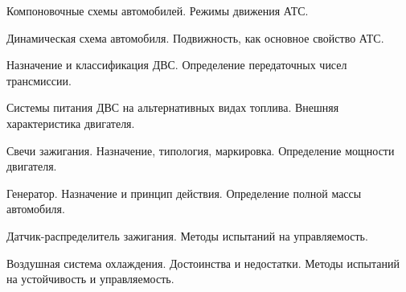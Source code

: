 \documentclass[
	14pt,
	a4paper,
	]
	{scrartcl}
\begin{document}
\newpage


\shapk
{}
\setcounter{zad}{0}

\vfill
\z Компоновочные схемы автомобилей.
 \vfill
\z Режимы движения АТС.
 \vfill

\vfill

\newpage


\shapk
{}
\setcounter{zad}{0}

\vfill
\z Динамическая схема  автомобиля.
 \vfill
\z Подвижность, как основное свойство АТС.
 \vfill

\vfill

\newpage


\shapk
{}
\setcounter{zad}{0}

\vfill
\z Назначение и классификация ДВС.
 \vfill
\z Определение передаточных чисел трансмиссии.
 \vfill

\vfill

\newpage


\shapk
{}
\setcounter{zad}{0}

\vfill
\z Системы питания ДВС на альтернативных видах топлива.
 \vfill
\z Внешняя характеристика двигателя.
 \vfill

\vfill

\newpage


\shapk
{}
\setcounter{zad}{0}

\vfill
\z Свечи зажигания. Назначение, типология, маркировка.
 \vfill
\z Определение мощности двигателя.
 \vfill

\vfill

\newpage


\shapk
{}
\setcounter{zad}{0}

\vfill
\z Генератор. Назначение и принцип действия.
 \vfill
\z Определение полной массы автомобиля.
 \vfill

\vfill

\newpage


\shapk
{}
\setcounter{zad}{0}

\vfill
\z Датчик-распределитель зажигания.
 \vfill
\z Методы испытаний на управляемость.
 \vfill

\vfill

\newpage


\shapk
{}
\setcounter{zad}{0}

\vfill
\z Воздушная система охлаждения. Достоинства и недостатки.
 \vfill
\z Методы испытаний на устойчивость и управляемость.
 \vfill
\end{document}

